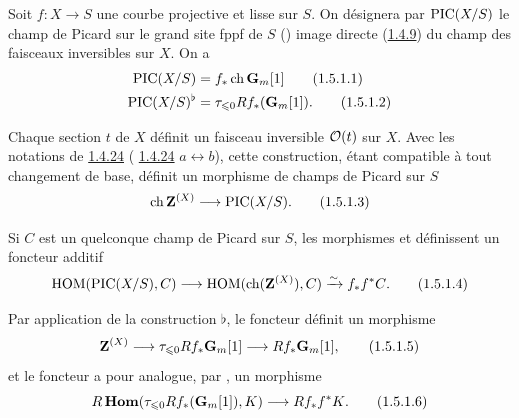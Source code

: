 \documentclass[10pt]{../fichiers-configuration-latex/smfart}
\begin{document}
\subsubsection{}
Soit $f:X\rightarrow S$ une courbe projective et lisse sur $S$. On
désignera par $\operatorname{PIC}(X/S)$ le champ de Picard sur le grand site fppf de
$S$ () image directe (\hyperref[XVIII.subsubsec1.4.9]{1.4.9}) du champ
des faisceaux inversibles sur $X$. On a
\begin{align*}
\operatorname{PIC}(X/S)&= f_{\ast}\operatorname{ch}\mathbf{G}_{m}[1]\tag{1.5.1.1}\\
\operatorname{PIC}(X/S)^{\flat} &=\tau_{\leqslant 0}
Rf_{\ast}(\mathbf{G}_{m}[1]){}.\tag{1.5.1.2}
\end{align*}

Chaque section $t$ de $X$ définit un faisceau inversible ${\mathcal O}(t)$
sur $X$. Avec les notations de \hyperref[XVIII.subsubsec1.4.24]{1.4.24} (\cf
\hyperref[XVIII.subsubsec1.4.24]{1.4.24} $a\leftrightarrow b$), cette
construction, étant compatible à tout changement de base, 
définit un morphisme de champs de Picard sur $S$
\begin{equation*}
\operatorname{ch} \mathbf{Z}^{(X)}\longrightarrow \operatorname{PIC}(X/S){}.\tag{1.5.1.3}
\end{equation*}

Si $C$ est un quelconque champ de Picard sur $S$, les morphismes
 et  définissent un foncteur additif
\begin{equation*}
\operatorname{HOM}(\operatorname{PIC}(X/S),C)\longrightarrow\operatorname{HOM}(\operatorname{ch}(\mathbf{Z}^{(X)}),
C)\xrightarrow{\sim} f_{\ast}f^{\ast}C{}.\tag{1.5.1.4}
\end{equation*}

Par application de la construction $\flat$, le foncteur 
définit un morphisme
\begin{equation*}
\mathbf{Z}^{(X)}\longrightarrow \tau_{\leqslant 0}
Rf_{\ast}\mathbf{G}_{m}[1]\longrightarrow
Rf_{\ast}\mathbf{G}_{m}[1]{},\tag{1.5.1.5}
\end{equation*}%
et le foncteur  a pour analogue, par , un morphisme
\begin{equation*}
R\operatorname{\mathbf{Hom}}(\tau_{\leqslant 0} Rf_{\ast}(\mathbf{G}_{m}[1]),K)\longrightarrow
Rf_{\ast} f^{\ast}K{}.\tag{1.5.1.6}
\end{equation*}
\end{document}
